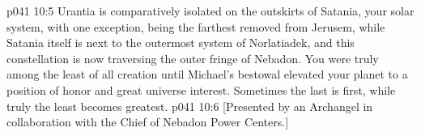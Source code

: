 \pc \vs p041 10:5 Urantia is comparatively isolated on the outskirts of Satania, your solar system, with one exception, being the farthest removed from Jerusem, while Satania itself is next to the outermost system of Norlatiadek, and this constellation is now traversing the outer fringe of Nebadon. You were truly among the least of all creation until Michael’s bestowal elevated your planet to a position of honor and great universe interest. Sometimes the last is first, while truly the least becomes greatest.
\vsetoff
\vs p041 10:6 [Presented by an Archangel in collaboration with the Chief of Nebadon Power Centers.]
